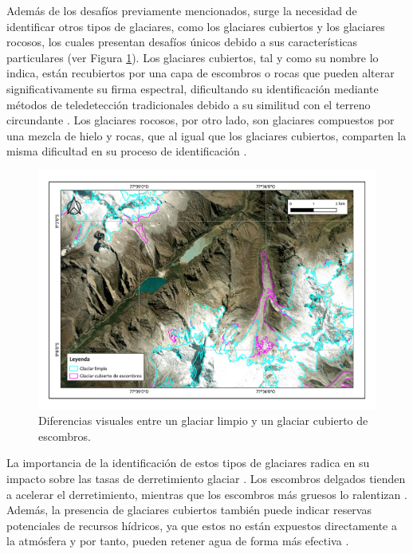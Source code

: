 Además de los desafíos previamente mencionados, surge la necesidad de identificar otros tipos de glaciares, como los glaciares cubiertos y los glaciares rocosos, los cuales presentan desafíos únicos debido a sus características particulares (ver Figura \ref{fig:ComparacionGlaciares}). Los glaciares cubiertos, tal y como su nombre lo indica, están recubiertos por una capa de escombros o rocas que pueden alterar significativamente su firma espectral, dificultando su identificación mediante métodos de teledetección tradicionales debido a su similitud con el terreno circundante \cite{zhang2019glacier}. Los glaciares rocosos, por otro lado, son glaciares compuestos por una mezcla de hielo y rocas, que al igual que los glaciares cubiertos, comparten la misma dificultad en su proceso de identificación \cite{robson2020automated}.

\begin{figure}[H]
    \begin{center}
        \includegraphics[width=1\textwidth]{Images/ComparacionGlaciares.pdf}
    \end{center}
    \caption{Diferencias visuales entre un glaciar limpio y un glaciar cubierto de escombros.}
    \label{fig:ComparacionGlaciares}
\end{figure}

La importancia de la identificación de estos tipos de glaciares radica en su impacto sobre las tasas de derretimiento glaciar \cite{lu2021novel}. Los escombros delgados tienden a acelerar el derretimiento, mientras que los escombros más gruesos lo ralentizan \cite{anderson2021causes}. Además, la presencia de glaciares cubiertos también puede indicar reservas potenciales de recursos hídricos, ya que estos no están expuestos directamente a la atmósfera y por tanto, pueden retener agua de forma más efectiva \cite{zhang2019role, florath2021optical}.

